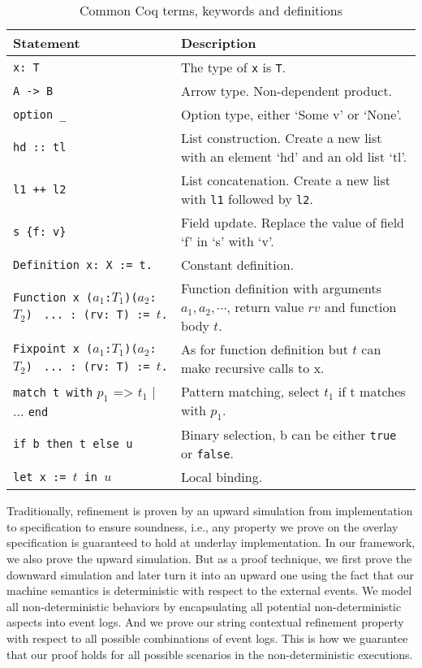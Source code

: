 \begin{table}
	\begin{tabular}[t]{p{}p{}}
	\hline
		{\centering Statement}	&	{\centering Description} \\
	\hline
		\texttt{x: T}					&	The type of \texttt{x} is \texttt{T}.\\
		\texttt{A -> B}					& 	Arrow type. Non-dependent product.\\
		\texttt{option \_}				&	Option type, either `Some v' or `None'.\\
		\texttt{hd :: tl}				&	List construction. Create a new list with an element `hd' and an old list `tl'.\\
		\texttt{l1 ++ l2}				& 	List concatenation. Create a new list with \texttt{l1} followed by \texttt{l2}.\\
		\texttt{s \{f: v\}}				&	Field update. Replace the value of field `f' in `s' with `v'. \\
		\texttt{Definition x: X := t.}	&	Constant definition. \\
		\parbox[t]{.3\textwidth}{\texttt{Function x ($a_1$:$T_1$)($a_2$:$T_2$)}\\
		\texttt{\hphantom{Func} ... : (rv: T) := $t$.}}
		 & Function definition with arguments $a_1, a_2, \cdots$, return value $rv$ and function body $t$.\\
		 \parbox[t]{.3\textwidth}{\texttt{Fixpoint x ($a_1$:$T_1$)($a_2$:$T_2$)}\\
		 \texttt{\hphantom{Fixp} ... : (rv: T) := $t$.}}
		 & As for function definition but $t$ can make recursive calls to x. \\
		\texttt{match t with} $p_1$ => $t_1$ | ...	\texttt{end}	&	Pattern matching, select $t_1$ if t matches with $p_1$.\\
		\texttt{if b then t else u}		&	Binary selection, b can be either \texttt{true} or \texttt{false}.\\
		\texttt{let x := $t$ in $u$}	&	Local binding.\\
		\hline
	\end{tabular}
	\caption{Common Coq terms, keywords and definitions}
	\label{table:coq}
\end{table}


Traditionally, refinement is proven by an upward simulation from implementation
to specification to ensure soundness, i.e., any property we prove on the overlay
specification is guaranteed to hold at underlay implementation. In our framework,
we also prove the upward simulation. But as a proof technique, we first prove the
downward simulation and later turn it into an upward one using the fact that our
machine semantics is deterministic with respect to the external events. We model
all non-deterministic behaviors by encapsulating all potential non-deterministic aspects
into event logs. And we prove our string contextual refinement property with respect
to all possible combinations of event logs. This is how we guarantee
that our proof holds for all possible scenarios in the non-deterministic
executions. 


